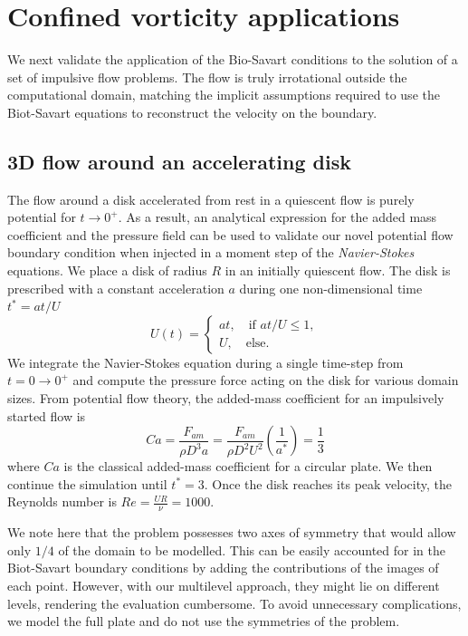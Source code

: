 \documentclass[preprint,12pt]{elsarticle}
\begin{document}
\section{Confined vorticity applications}

We next validate the application of the Bio-Savart conditions to the solution of a set of impulsive flow problems. The flow is truly irrotational outside the computational domain, matching the implicit assumptions required to use the Biot-Savart equations to reconstruct the velocity on the boundary. 

\subsection{3D flow around an accelerating disk}

The flow around a disk accelerated from rest in a quiescent flow is purely potential for $t\to 0^+$. As a result, an analytical expression for the added mass coefficient and the pressure field can be used to validate our novel potential flow boundary condition when injected in a moment step of the \emph{Navier-Stokes} equations. We place a disk of radius $R$ in an initially quiescent flow. The disk is prescribed with a constant acceleration $a$ during one non-dimensional time $t^*=at/U$
\begin{equation}
    U(t) = \begin{cases}
        at, \quad \text{if } at/U\le1,\\
        U, \quad \text{else}.
    \end{cases}
\end{equation}
We integrate the Navier-Stokes equation during a single time-step from $t=0\to0^+$ and compute the pressure force acting on the disk for various domain sizes. From potential flow theory, the added-mass coefficient for an impulsively started flow is
\begin{equation}
    Ca  = \frac{F_{am}}{\rho D^3 a} = \frac{F_{am}}{\rho D^2U^2}\left(\frac{1}{a^*}\right) = \frac{1}{3}
\end{equation}
where $Ca$ is the classical added-mass coefficient for a circular plate. We then continue the simulation until $t^*=3$. Once the disk reaches its peak velocity, the Reynolds number is $Re=\frac{UR}{\nu}=1000$.

We note here that the problem possesses two axes of symmetry that would allow only $1/4$ of the domain to be modelled. This can be easily accounted for in the Biot-Savart boundary conditions by adding the contributions of the images of each point. However, with our multilevel approach, they might lie on different levels, rendering the evaluation cumbersome. To avoid unnecessary complications, we model the full plate and do not use the symmetries of the problem.
\end{document}
